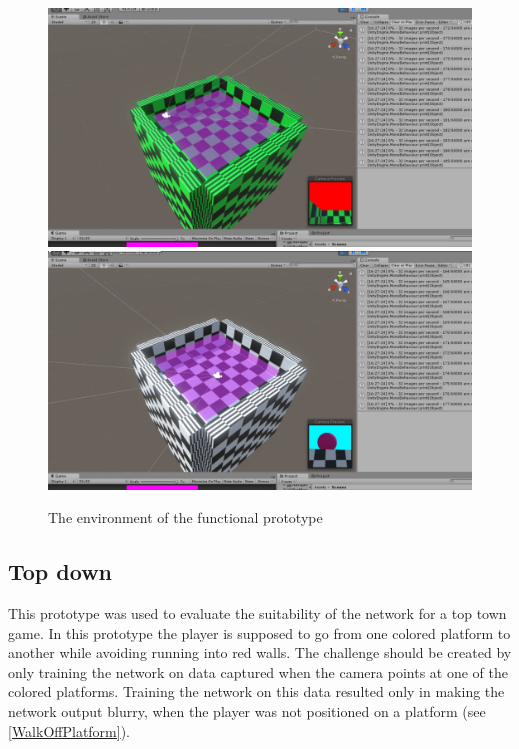 \begin{figure}[p]
  \centering
  \includegraphics[width=\imgWidth]{images/workflow/Functional1.png} \\[\picVdist]
  \includegraphics[width=\imgWidth]{images/workflow/Functional2.png}
  \caption{The environment of the functional prototype}
  \label{Funcional}
\end{figure}


\subsection{Top down}
This prototype was used to evaluate the suitability of the network for a top town game. In this prototype the player is supposed to go from one colored platform to another while avoiding running into red walls. The challenge should be created by only training the network on data captured when the camera points at one of the colored platforms. Training the network on this data resulted only in making the network output blurry, when the player was not positioned on a platform (see \cref{WalkOffPlatform}).

